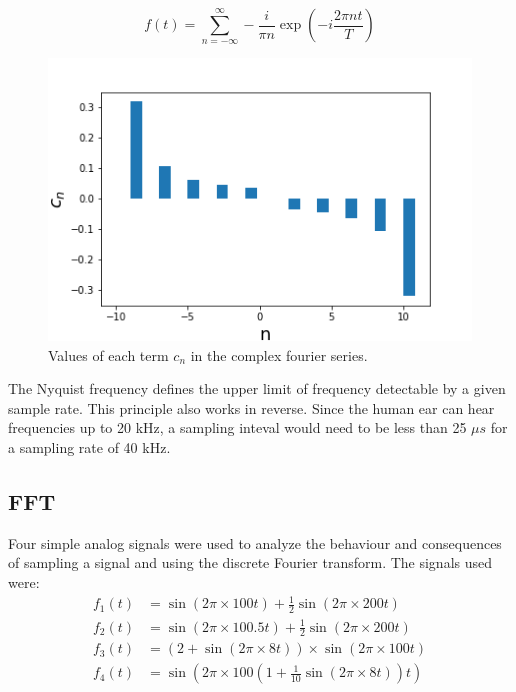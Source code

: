 \documentclass[twocolumn]{article}
\begin{document}
\[
f(t) = \sum_{n= -\infty}^{\infty} -\frac{i}{\pi n} \exp(-i \frac{2\pi nt}{T})
\]

\begin{figure}
\centering
\includegraphics[width=\linewidth]{Figure2}
\caption{Values of each term $c_n$ in the complex fourier series.}
\label{fig:Figure2}
\end{figure}

The Nyquist frequency defines the upper limit of frequency detectable by a given sample rate. This principle also works in reverse. Since the human ear can hear frequencies up to 20 kHz, a sampling inteval would need to be less than 25 $\mu s$ for a sampling rate of 40 kHz.

\subsection{FFT}
Four simple analog signals were used to analyze the behaviour and consequences
of sampling a signal and using the discrete Fourier transform. The signals used
were:
\begin{equation}
	\begin{aligned}
		f_1(t)  &= \sin(2 \pi \times 100 t) + \frac{1}{2} \sin(2 \pi \times 200 t) \\
		f_2(t) &= \sin(2 \pi \times 100.5 t) + \frac{1}{2} \sin(2 \pi \times 200 t) \\
		f_3(t) &= \left( 2 + \sin(2 \pi \times 8 t) \right) \times \sin(2 \pi \times 100 t) \\
		f_4(t) &= \sin \left( 2 \pi \times 100 \left( 1 + \frac{1}{10} \sin(2 \pi \times 8 t) \right) t \right)
	\end{aligned}
	\label{fft_eqs}
\end{equation}
\end{document}
